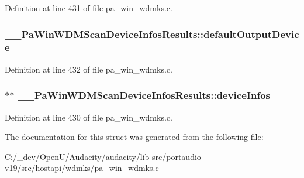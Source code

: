 Definition at line 431 of file pa\+\_\+win\+\_\+wdmks.\+c.

\subsubsection[{\texorpdfstring{default\+Output\+Device}{defaultOutputDevice}}]{ \+\_\+\+\_\+\+Pa\+Win\+W\+D\+M\+Scan\+Device\+Infos\+Results\+::default\+Output\+Device}\hypertarget{struct_____pa_win_w_d_m_scan_device_infos_results_ae035601f901c22bee7f4d4fb456e6f27}{}\label{struct_____pa_win_w_d_m_scan_device_infos_results_ae035601f901c22bee7f4d4fb456e6f27}


Definition at line 432 of file pa\+\_\+win\+\_\+wdmks.\+c.

\subsubsection[{\texorpdfstring{device\+Infos}{deviceInfos}}]{$\ast$$\ast$ \+\_\+\+\_\+\+Pa\+Win\+W\+D\+M\+Scan\+Device\+Infos\+Results\+::device\+Infos}\hypertarget{struct_____pa_win_w_d_m_scan_device_infos_results_a2fe91f3f6605d7624f4b47f4b43aa5c1}{}\label{struct_____pa_win_w_d_m_scan_device_infos_results_a2fe91f3f6605d7624f4b47f4b43aa5c1}


Definition at line 430 of file pa\+\_\+win\+\_\+wdmks.\+c.



The documentation for this struct was generated from the following file\+:\begin{DoxyCompactItemize}
\item 
C\+:/\+\_\+dev/\+Open\+U/\+Audacity/audacity/lib-\/src/portaudio-\/v19/src/hostapi/wdmks/\hyperlink{pa__win__wdmks_8c}{pa\+\_\+win\+\_\+wdmks.\+c}\end{DoxyCompactItemize}
